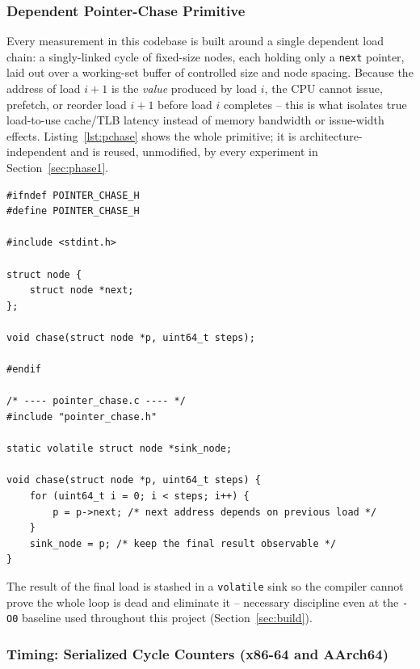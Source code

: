 \documentclass{article}
\begin{document}
\subsubsection{Dependent Pointer-Chase Primitive}

Every measurement in this codebase is built around a single dependent load chain: a
singly-linked cycle of fixed-size nodes, each holding only a \texttt{next} pointer, laid
out over a working-set buffer of controlled size and node spacing. Because the address of
load $i+1$ is the \emph{value} produced by load $i$, the CPU cannot issue, prefetch, or
reorder load $i+1$ before load $i$ completes -- this is what isolates true load-to-use
cache/TLB latency instead of memory bandwidth or issue-width effects. Listing~\ref{lst:pchase}
shows the whole primitive; it is architecture-independent and is reused, unmodified, by
every experiment in Section~\ref{sec:phase1}.

\begin{lstlisting}[caption={Dependent pointer-chase primitive (portable, all architectures). File: \texttt{main\_code/common/pointer\_chase.h} / \texttt{pointer\_chase.c}, commit \texttt{e0f2538}.},label={lst:pchase}]
#ifndef POINTER_CHASE_H
#define POINTER_CHASE_H

#include <stdint.h>

struct node {
    struct node *next;
};

void chase(struct node *p, uint64_t steps);

#endif

/* ---- pointer_chase.c ---- */
#include "pointer_chase.h"

static volatile struct node *sink_node;

void chase(struct node *p, uint64_t steps) {
    for (uint64_t i = 0; i < steps; i++) {
        p = p->next; /* next address depends on previous load */
    }
    sink_node = p; /* keep the final result observable */
}
\end{lstlisting}

The result of the final load is stashed in a \texttt{volatile} sink so the compiler cannot
prove the whole loop is dead and eliminate it -- necessary discipline even at the
\texttt{-O0} baseline used throughout this project (Section~\ref{sec:build}).

\subsubsection{Timing: Serialized Cycle Counters (x86-64 and AArch64)}
\end{document}
